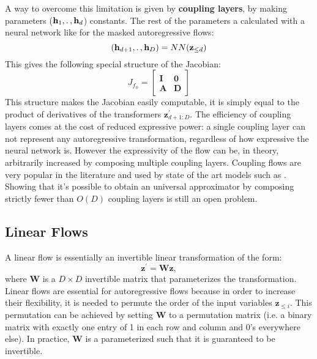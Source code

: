 \documentclass[english]{scrartcl}
\begin{document}
    A way to overcome this limitation is given by \textbf{coupling layers}, by making parameters ($\textbf{h}_1, \ldotp, \textbf{h}_d$) constants.
    The rest of the parameters a calculated with a neural network like for the masked autoregressive flows:
    \begin{equation}
    (\textbf{h}_{d+1}, \ldotp, \textbf{h}_D)
        = NN(\textbf{z}_{\leq d})
    \end{equation}
    This gives the following special structure of the Jacobian:
    \begin{equation}
        J_{f_{\phi}} = \begin{bmatrix}
                           \textbf{I} & \textbf{0}\\
                           \textbf{A} & \textbf{D}
        \end{bmatrix}
    \end{equation}
    This structure makes the Jacobian easily computable, it is simply equal to the product of derivatives of the
    transformers $\textbf{z}^{\prime}_{d+1:D}$.
    The efficiency of coupling layers comes at the cost of reduced expressive power: a single coupling layer can not represent
    any autoregressive transformation, regardless of how expressive the neural network is.
    However the expressivity of the flow can be, in theory, arbitrarily increased by composing multiple coupling layers.
    Coupling flows are very popular in the literature and used by state of the art models such as \citep[NICE, Glow, WaveGlow, Flow++]{dinh_nice_2015,kingma_glow_2018, prenger_waveglow_2019, ho_flow_2019}.
    Showing that it's possible to obtain an universal approximator by composing strictly fewer than $O(D)$ coupling layers is still an open problem.

    \subsection{Linear Flows}
    A linear flow is essentially an invertible linear transformation of the form:
    \begin{equation}
        \textbf{z}^{\prime} = \textbf{W} \textbf{z},
    \end{equation}
    where $\textbf{W}$ is a $D \times D$ invertible matrix that parameterizes the transformation.
    Linear flows are essential for autoregressive flows because in order to increase their flexibility, it is needed to permute the order of the input variables $\textbf{z}_{\leq i}$.
    This permutation can be achieved by setting $\textbf{W}$ to a permutation matrix (i.e. a binary matrix with exactly one entry of 1 in each row and column and 0's everywhere else).
    In practice, $\textbf{W}$ is a parameterized such that it is guaranteed to be invertible.
\end{document}
